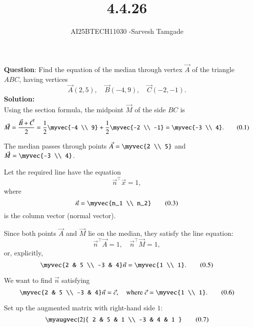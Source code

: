 \documentclass[journal]{IEEEtran}
\begin{document}

\vspace{3cm}

\title{4.4.26}
\author{AI25BTECH11030 -Sarvesh Tamgade}
{\let\newpage\relax\maketitle}

\renewcommand{\thefigure}{\theenumi}
\renewcommand{\thetable}{\theenumi}
\setlength{\intextsep}{10pt} 


\renewcommand{\thetable}{\theenumi}


\textbf{Question}: Find the equation of the median through vertex \(\vec{A}\) of the triangle \(ABC\), having vertices
\[
\vec{A}(2,5), \quad \vec{B}(-4,9), \quad \vec{C}(-2,-1).
\]
\textbf{Solution:} \\

Using the section formula, the midpoint \(\vec{M}\) of the side \(BC\) is
\[
\vec{M} = \frac{\vec{B} + \vec{C}}{2} = 
\frac{1}{2} \myvec{-4 \\ 9} + 
\frac{1}{2} \myvec{-2 \\ -1} = 
\myvec{-3 \\ 4}.
\tag{0.1}
\]

The median passes through points \(\vec{A} = \myvec{2 \\ 5}\) and \(\vec{M} = \myvec{-3 \\ 4}\).

Let the required line have the equation
\[
\vec{n}^\top \vec{x} = 1,
\tag{0.2}
\]
where
\[
\vec{n} = \myvec{n_1 \\ n_2}
\tag{0.3}
\]
is the column vector (normal vector).

Since both points \(\vec{A}\) and \(\vec{M}\) lie on the median, they satisfy the line equation:
\[
\vec{n}^\top \vec{A} = 1, \quad \vec{n}^\top \vec{M} = 1,
\tag{0.4}
\]
or, explicitly,
\[
\myvec{2 & 5 \\ -3 & 4} \vec{n} = \myvec{1 \\ 1}.
\tag{0.5}
\]

We want to find \(\vec{n}\) satisfying
\[
\myvec{2 & 5 \\ -3 & 4} \vec{n} = \vec{c},
\quad \text{where } \vec{c} = \myvec{1 \\ 1}.
\tag{0.6}
\]

Set up the augmented matrix with right-hand side \(1\):
\[
\myaugvec{2}{
2 & 5 & 1 \\
-3 & 4 & 1
}
\tag{0.7}
\]
\end{document}
